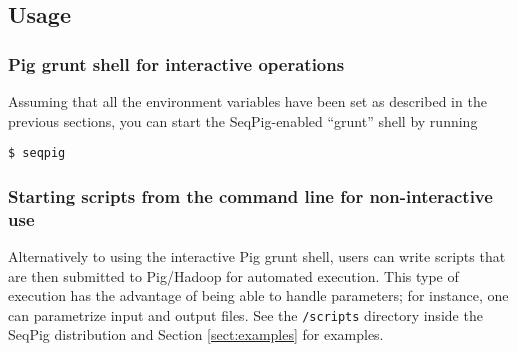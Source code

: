 \subsection{Usage}

\subsubsection{Pig grunt shell for interactive operations}
Assuming that all the environment variables have been set as described in the
previous sections, you can start the SeqPig-enabled ``grunt'' shell by running
%
\begin{lstlisting}
$ seqpig
\end{lstlisting}
%
\subsubsection{Starting scripts from the command line for non-interactive use}
Alternatively to using the interactive Pig grunt shell, users can write scripts
that are then submitted to Pig/Hadoop for automated execution. This type of
execution has the advantage of being able to handle parameters; for instance,
one can parametrize input and output files. See the {\tt /scripts} directory
inside the SeqPig distribution and Section \ref{sect:examples} for examples.
